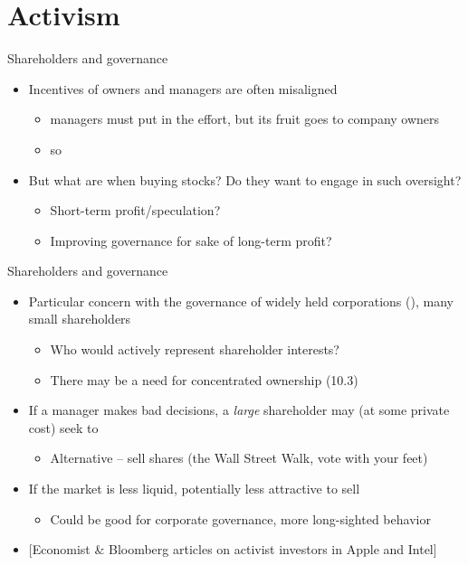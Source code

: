 \documentclass[english,10pt
,aspectratio=169
]{beamer}
\begin{document}
\section{Activism}

\begin{frame}{Shareholders and governance}
	\begin{itemize}
		\item Incentives of owners and managers are often misaligned
		\begin{itemize}
			\item managers must put in the effort, but its fruit goes to company owners
			\item so 
		\end{itemize}
		\pause 
		\item But what are  when buying stocks? Do they want to engage in such oversight?
		\begin{itemize}
			\item Short-term profit/speculation?
			\item Improving governance for sake of long-term profit?
		\end{itemize}
	\end{itemize}
\end{frame}


\begin{frame}{Shareholders and governance}
	\begin{itemize}
		\item Particular concern with the governance of widely held corporations (\cite{berle_modern_1932}), many small shareholders
		\begin{itemize}
			\item Who would actively represent shareholder interests?
			\item There may be a need for concentrated ownership (10.3)
		\end{itemize}
		\item If a manager makes bad decisions, a \emph{large} shareholder may (at some private cost) seek to 
		\begin{itemize}
			\item Alternative -- sell shares (the Wall Street Walk, vote with your feet)
		\end{itemize}
		\item If the market is less liquid, potentially less attractive to sell
		\begin{itemize}
			\item Could be good for corporate governance, more long-sighted behavior
		\end{itemize}
		\item $[$Economist \& Bloomberg articles on activist investors in Apple and Intel]
	\end{itemize}
\end{frame}
\end{document}
